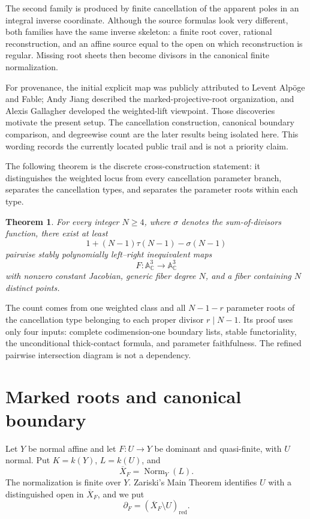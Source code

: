 \documentclass[11pt]{article}
\newtheorem{theorem}{Theorem}[section]
\newcommand{\A}{\mathbb A}
\newcommand{\C}{\mathbb C}
\newcommand{\Norm}{\operatorname{Norm}}
\begin{document}
The second family is produced by finite cancellation of the apparent poles
in an integral inverse coordinate.  Although the source formulas look very
different, both families have the same inverse skeleton: a finite root cover,
rational reconstruction, and an affine source equal to the open on which
reconstruction is regular.  Missing root sheets then become divisors in the
canonical finite normalization.

For provenance, the initial explicit map was publicly attributed to Levent
Alp\"oge and Fable; Andy Jiang described the marked-projective-root
organization, and Alexis Gallagher developed the weighted-lift viewpoint.
Those discoveries motivate the present setup.  The cancellation construction,
canonical boundary comparison, and degreewise count are the later results
being isolated here.  This wording records the currently located public
trail and is not a priority claim.

The following theorem is the discrete cross-construction statement: it distinguishes
the weighted locus from every cancellation parameter branch, separates the
cancellation types, and separates the parameter roots within each type.

\begin{theorem}\label{thm:main}
For every integer $N\ge4$, where $\sigma$ denotes the sum-of-divisors
function, there exist at least
\[
 1+(N-1)\tau(N-1)-\sigma(N-1)
\]
pairwise stably polynomially left--right inequivalent maps
\[
 F:\A^3_{\C}\longrightarrow\A^3_{\C}
\]
with nonzero constant Jacobian, generic fiber degree $N$, and a fiber
containing $N$ distinct points.
\end{theorem}

The count comes from one weighted class and all $N-1-r$ parameter roots of
the cancellation type belonging to each proper divisor $r\mid N-1$.  Its
proof uses only four inputs: complete codimension-one boundary lists, stable
functoriality, the unconditional thick-contact formula, and parameter
faithfulness.  The refined pairwise intersection diagram is not a dependency.

\section{Marked roots and canonical boundary}

Let $Y$ be normal affine and let $F:U\to Y$ be dominant and quasi-finite,
with $U$ normal.  Put $K=k(Y)$, $L=k(U)$, and
\[
 \overline X_F=\Norm_Y(L).
\]
The normalization is finite over $Y$.  Zariski's Main Theorem identifies
$U$ with a distinguished open in $\overline X_F$, and we put
\[
 \partial_F=(\overline X_F\setminus U)_{\mathrm{red}}.
\]
\end{document}
